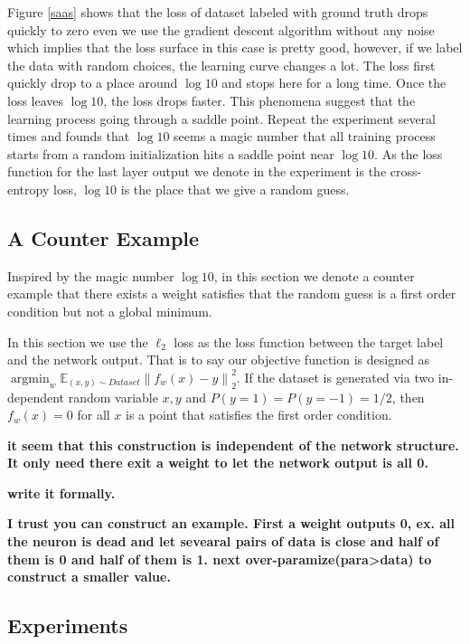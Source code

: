 \documentclass{article}
\theoremstyle{plain}
\theoremstyle{definition}
\DeclareMathOperator*{\argmin}{argmin}
\begin{document}
Figure \ref{saas} shows that the loss of dataset labeled with ground truth drops quickly to zero even we use the gradient descent algorithm without any noise which implies that the loss surface in this case is pretty good, however, if we label the data with random choices, the learning curve changes a lot. The loss first quickly drop to a place around $\log 10$ and stops here for a long time. Once the loss leaves $\log 10$, the loss drops faster. This phenomena suggest that the learning process going through a saddle point. Repeat the experiment several times and founds that $\log10$ seems a magic number that all training process starts from a random initialization hits a saddle point near $\log 10$. As the loss function for the last layer output we denote in the experiment is the cross-entropy loss, $\log 10$ is the place that we give a random guess.


\subsection{A Counter Example}

Inspired by the magic number $\log 10$, in this section we denote a counter example that there exists a weight satisfies that the random guess is a first order condition but not a global minimum.

In this section we use the $\ell_2$ loss as the loss function between the target label and the network output. That is to say our objective function is designed as $\argmin_w\mathbb{E}_{(x,y)\sim Dataset}\left\|f_w(x)-y\right\|_2^2$. If the dataset is generated via two in-dependent random variable $x,y$ and $P(y=1)=P(y=-1)=1/2$, then $f_w(x)=0$ for all $x$ is a point that satisfies the first order condition.


\textbf{it seem that this construction is independent of the network structure. It only need there exit a weight to let the network output is all 0.}

\textbf{write it formally.}

\textbf{I trust you can construct an example. First a weight outputs 0, ex. all the neuron is dead and let sevearal pairs of data is close and half of them is 0 and half of them is 1. next over-paramize(para>data) to construct a smaller value.}

\subsection{Experiments}
\end{document}
